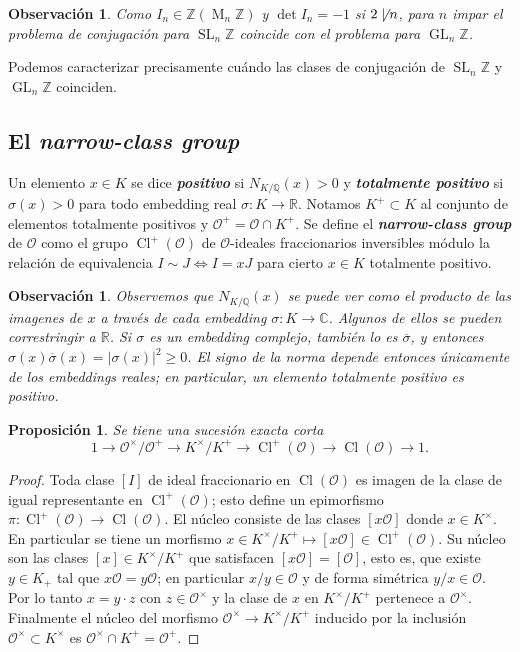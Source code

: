 \documentclass[11pt,a4paper]{amsart}
\newcommand{\C}{\mathbb{C}}
\newcommand{\R}{\mathbb{R}}
\newcommand{\Q}{\mathbb{Q}}
\newcommand{\Z}{\mathbb{Z}}
\renewcommand{\emph}[1]{\textbf{\textit{#1}}}
\DeclareMathOperator{\Cl}{Cl}
\DeclareMathOperator{\M}{M}
\DeclareMathOperator{\GL}{GL}
\DeclareMathOperator{\SL}{SL}
\DeclareMathOperator{\CL}{Cl}
\numberwithin{equation}{section}
\theoremstyle{plain}
\newtheorem{prop}[equation]{Proposición}
\newtheorem{obs}[equation]{Observación}
\renewcommand{\O}{\mathcal{O}}
\begin{document}
\begin{obs} Como $I_n \in \Z(\M_n \Z)$
y $\det I_n = -1$ si $2 \not \mid n$, para $n$ impar el problema
de conjugación para $\SL_n \Z$ coincide con el problema para $\GL_n \Z$.
\end{obs}

Podemos caracterizar precisamente cuándo las clases de conjugación
de $\SL_n \Z$ y $\GL_n \Z$ coinciden. 

\subsection{El \emph{narrow-class group}}

Un elemento $x \in K$ se dice \emph{positivo}
si $N_{K/\Q}(x) > 0$ y \emph{totalmente positivo}
si $\sigma(x) > 0$
para todo embedding real $\sigma \colon K \to \R$.
Notamos $K^+ \subset K$
al conjunto de elementos totalmente positivos y
$\O^+ = \O \cap K^+$.
Se define el \emph{narrow-class group} de $\O$ como
el grupo $\Cl^+(\O)$ de $\O$-ideales fraccionarios inversibles
módulo la relación de
equivalencia $I \sim J \iff I = xJ$ para cierto $x \in K$ totalmente
positivo.

\begin{obs} Observemos que $N_{K/\Q}(x)$ se puede ver como el
producto de las imagenes de $x$ a través de cada
\textit{embedding} $\sigma \colon K \to \C$. Algunos de ellos
se pueden correstringir a $\R$. Si $\sigma$ es un embedding complejo,
también lo es $\overline \sigma$, y entonces
$\sigma(x)\overline\sigma(x) = |\sigma(x)|^2 \ge 0$. El signo
de la norma depende entonces únicamente de los embeddings reales; en
particular, un elemento totalmente positivo es positivo.
\end{obs}

\begin{prop} Se tiene una sucesión exacta corta
\[
1 \to \O^\times/\O^+ \to K^\times/K^+ \to
\CL^+(\O) \to \CL(\O) \to 1.
\]
\end{prop}
\begin{proof} Toda clase $[I]$ de ideal fraccionario
en $\CL(\O)$ es imagen de la clase de igual representante en $\CL^+(\O)$;
esto define un epimorfismo $\pi \colon \CL^+(\O)\to\CL(\O)$. El núcleo consiste
de las clases $[x \O]$ donde $x \in K^\times$. En particular se tiene
un morfismo $x\in K^\times/K^+ \mapsto [x \O] \in \CL^+(\O)$.
Su núcleo son las clases $[x] \in K^\times/K^+$ que satisfacen
$[x\O] = [\O]$, esto es, que existe $y \in K_+$ tal que $x \O = y \O$;
en particular $x/y \in \O$ y de forma simétrica $y/x \in \O$.
Por lo tanto $x = y \cdot z$ con $z \in \O^\times$
y la clase de $x$ en $K^\times/K^+$ pertenece a $\O^\times$. Finalmente
el núcleo del morfismo $\O^\times \to K^\times/K^+$ inducido por la inclusión
$\O^\times \subset K^\times$ es $\O^\times \cap K^+ = \O^+$.
\end{proof}
\end{document}
